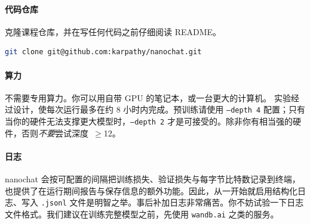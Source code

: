 \paragraph{代码仓库}  克隆课程仓库，并在写任何代码之前仔细阅读 README。

\begin{lstlisting}[language=bash, caption={克隆 nanochat 仓库}]
git clone git@github.com:karpathy/nanochat.git
\end{lstlisting}

\paragraph{算力}  不需要专用算力。你可以用自带 GPU 的笔记本，或一台更大的计算机。%
实验经过设计，使每次运行最多在约 8 小时内完成。预训练请使用 \texttt{--depth~4} 配置；只有当你的硬件无法支撑更大模型时，\texttt{--depth~2} 才是可接受的。除非你有相当强的硬件，否则\emph{不要}尝试深度~$\geq$12。

\paragraph{日志}  nanochat 会按可配置的间隔把训练损失、验证损失与每字节比特数记录到终端，也提供了在运行期间报告与保存信息的额外功能。因此，从一开始就启用结构化日志、写入 \texttt{.jsonl} 文件是明智之举。事后补加日志非常痛苦。你不妨试验一下日志文件格式。我们建议在训练完整模型之前，先使用 \texttt{wandb.ai} 之类的服务。



